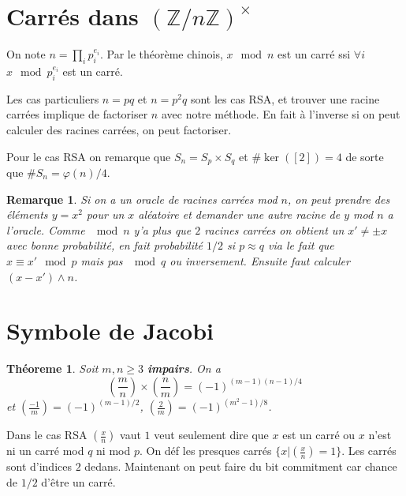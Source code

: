\documentclass[a4paper,12pt]{book}
\newcommand{\Z}{\mathbb{Z}}
\theoremstyle{plain}
\newtheorem{thm}[subsection]{Théoreme}
\newtheorem{rem}{Remarque}
\theoremstyle{definition}
\theoremstyle{remark}
\begin{document}
\section{Carrés dans $(\Z/n\Z)^{\times}$}
On note $n=\prod_i p_i^{e_i}$. Par le théorème chinois, $x\mod n$ est
un carré ssi $\forall i$ $x\mod p_i^{e_i}$ est un carré. 

Les cas particuliers $n=pq$ et $n=p^2q$ sont les cas RSA, et trouver
une racine carrées implique de factoriser $n$ avec notre méthode. En
fait à l'inverse si on peut calculer des racines carrées, on peut 
factoriser.

Pour le cas RSA on remarque que $S_n=S_p\times S_q$ et $\#\ker([2])=4$
de sorte que $\#S_n=\varphi(n)/4$.

\begin{rem}
    Si on a un oracle de racines carrées mod $n$, on peut prendre
    des éléments $y=x^2$ pour un $x$ aléatoire et demander une autre
    racine de $y$ mod $n$ a l'oracle. Comme $\mod n$ y'a plus que $2$
    racines carrées on obtient un $x'\ne \pm x$ avec bonne probabilité,
    en fait probabilité $1/2$ si $p\approx q$ via le fait que $x\equiv x'
    \mod p$ mais pas $\mod q$ ou inversement. Ensuite faut calculer
    $(x-x')\wedge n$.
\end{rem}

\section{Symbole de Jacobi}
\begin{thm}
    Soit $m,n\geq 3$ \textbf{impairs}. On a
    \[\left(\frac{m}{n}\right)\times \left(\frac{n}{m}\right)=(-1)^{(m-1)(n-1)/4}\]
    et $\left(\frac{-1}{m}\right)=(-1)^{(m-1)/2}$, $\left(\frac{2}{m}\right)=(-1)^{(m^2-1)/8}$.
\end{thm}
Dans le cas RSA $\left(\frac{x}{n}\right)$ vaut $1$ veut seulement
dire que $x$ est un carré ou $x$ n'est ni un carré mod $q$ ni mod $p$.
On déf les presques carrés $\{x|\left(\frac{x}{n}\right)=1\}$. Les
carrés sont d'indices $2$ dedans. Maintenant on peut faire du bit
commitment car chance de $1/2$ d'être un carré.
\end{document}
